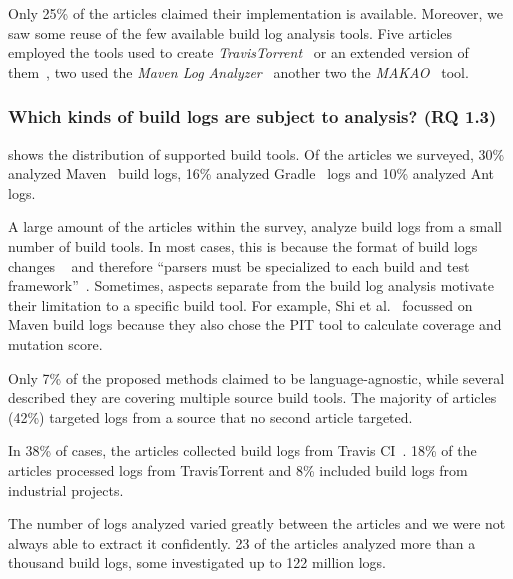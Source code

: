 Only 25\% of the articles claimed their implementation is available.
Moreover, we
saw some reuse of the few available build log analysis tools.
Five articles employed the tools used to create
\emph{TravisTorrent}~\cite{beller2017travistorrent,beller2017oops,
orellana2017differences,zhao2018comparing} or
an extended version of them~\cite{rott2019empirische,
shi2018evaluating}, two used the
\emph{Maven Log Analyzer}~\cite{macho2018automatically,gallaba2018noise}
another two the
\emph{MAKAO}~\cite{wen2018blimp,adams2007design,adams2007makao} tool.

\subsubsection{Which kinds of build logs are subject to
  analysis? (RQ 1.3)}
 shows the distribution of supported
build tools.
Of the articles we surveyed, 30\% analyzed
Maven~\cite{maven2019website} build logs,
16\% analyzed Gradle~\cite{gradle2020website} logs
and 10\% analyzed Ant~\cite{ant2020website} logs.

A large amount of the articles within the survey, analyze build logs
from a small number of build tools.
In most cases, this is because the format of build logs changes
~\cite{staahl2014modeling} and
therefore ``parsers must be specialized to each build and test
framework''~\cite{tomassi2019bugswarm}.
Sometimes, aspects separate from the build log analysis motivate
their limitation to a specific build tool.
For example, Shi et al.~\cite{shi2018evaluating} focussed on Maven
build logs because they also chose the PIT tool to calculate coverage
and mutation score.

Only 7\% of the proposed methods claimed to be language-agnostic, while
several described they are covering multiple source build tools.
The majority of articles (42\%) targeted logs from a source that no
second article
targeted.

In 38\% of cases, the articles collected build logs from Travis
CI~\cite{travisci2019webpage}.
18\% of the articles processed logs from TravisTorrent and 8\% included
build logs from industrial projects.

The number of logs analyzed varied greatly between the articles
and we were not always able to
extract it confidently.
23 of the articles analyzed more than a thousand build logs, some
investigated up to 122 million logs.

